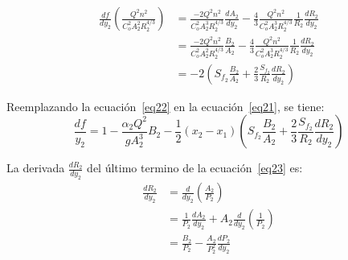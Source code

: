 \documentclass[11pt, oneside]{article}
\begin{document}
\begin{equation}
\begin{split}
    \frac{d f}{dy_2}\left( \frac{Q^2 n^2}{C_o^2 A_2^2 R_2^{4/3}} \right) &= \frac{-2 Q^2 n^2}{C_o^2 A_2^3 R_2^{4/3}}\frac{d A_2}{dy_2} - \frac{4}{3}\frac{Q^2 n^2}{C_o^2 A_2^3 R_2^{4/3}}\frac{1}{R_2}\frac{d R_2}{dy_2} \\
                                                                       &= \frac{-2 Q^2 n^2}{C_o^2 A_2^2 R_2^{4/3}}\frac{B_2}{A_2} - \frac{4}{3}\frac{Q^2 n^2}{C_o^2 A_2^3 R_2^{4/3}}\frac{1}{R_2}\frac{d R_2}{dy_2} \\
                                                                       &= -2 \left( S_{f_2}\frac{B_2}{A_2} + \frac{2}{3}\frac{S_{f_2}}{R_2}\frac{d R_2}{dy_2} \right)
\end{split}
\label{eq22}
\end{equation}

Reemplazando la ecuaci\'on~\ref{eq22} en la ecuaci\'on~\ref{eq21}, se tiene:
\begin{equation}
    \frac{df}{y_2} = 1 - \frac{\alpha_2 Q^2}{g A_2^3}B_2 - \frac{1}{2}\left( x_2 - x_1 \right)\left( S_{f_2}\frac{B_2}{A_2} + \frac{2}{3}\frac{S_{f_2}}{R_2}\frac{d R_2}{dy_2} \right)
\label{eq23}
\end{equation}

La derivada $\frac{d R_2}{dy_2}$ del \'ultimo termino de la ecuaci\'on~\ref{eq23} es:
\begin{equation}
\begin{split}
    \frac{d R_2}{d y_2} &= \frac{d}{d y_2} \left( \frac{A_2}{P_2} \right)\\
                        &= \frac{1}{P_2}\frac{d A_2}{d y_2} + A_2 \frac{d}{d y_2}\left( \frac{1}{P_2} \right)\\
                        &= \frac{B_2}{P_2} - \frac{A_2}{P_2^2}\frac{d P_2}{d y_2} 
\end{split}
\label{eq24}
\end{equation}
\end{document}
